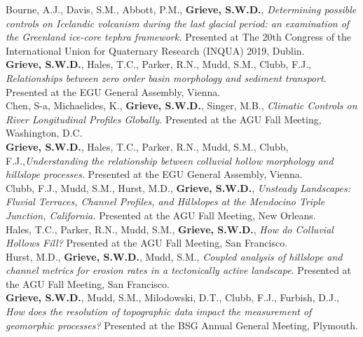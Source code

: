 \documentclass[10pt, a4paper]{article}
\newcommand{\years}[1]{\marginnote{\scriptsize #1}}
\begin{document}
\years{2019}Bourne, A.J., Davis, S.M., Abbott, P.M., \textbf{Grieve, S.W.D.}, \textit{Determining possible controls on Icelandic volcanism during the last glacial period: an examination of the Greenland ice-core tephra framework.} Presented at The 20th Congress of the International Union for Quaternary Research (INQUA) 2019, Dublin.\\[0.05cm]

\years{2019}\textbf{Grieve, S.W.D.}, Hales, T.C., Parker, R.N., Mudd, S.M., Clubb, F.J., \textit{Relationships between zero order basin morphology and sediment transport.} Presented at the EGU General Assembly, Vienna.\\[0.05cm]

\years{2018}Chen, S-a, Michaelides, K., \textbf{Grieve, S.W.D.}, Singer, M.B., \textit{Climatic Controls on River Longitudinal Profiles Globally.} Presented at the AGU Fall Meeting, Washington, D.C.\\[0.05cm]

\years{2018}\textbf{Grieve, S.W.D.}, Hales, T.C., Parker, R.N., Mudd, S.M., Clubb, F.J.,\textit{Understanding the relationship between colluvial hollow morphology and hillslope processes.} Presented at the EGU General Assembly, Vienna.\\[0.05cm]

\years{2017}Clubb, F.J., Mudd, S.M., Hurst, M.D., \textbf{Grieve, S.W.D.}, \textit{Unsteady Landscapes: Fluvial Terraces, Channel Profiles, and Hillslopes at the Mendocino Triple Junction, California.} Presented at the AGU Fall Meeting, New Orleans.\\[0.05cm]

\years{2016}Hales, T.C., Parker, R.N., Mudd, S.M., \textbf{Grieve, S.W.D.}, \textit{How do Colluvial Hollows Fill?} Presented at the AGU Fall Meeting, San Francisco.\\[0.05cm]

\years{2016}Hurst, M.D., \textbf{Grieve, S.W.D.}, Mudd, S.M., \textit{Coupled analysis of hillslope and channel metrics for erosion rates in a tectonically active landscape}. Presented at the AGU Fall Meeting, San Francisco.\\[0.05cm]

\years{2016}\textbf{Grieve, S.W.D.}, Mudd, S.M., Milodowski, D.T., Clubb, F.J., Furbish, D.J., \textit{How does the resolution of topographic data impact the measurement of geomorphic processes?} Presented at the BSG Annual General Meeting, Plymouth.\\[0.05cm]
\end{document}

